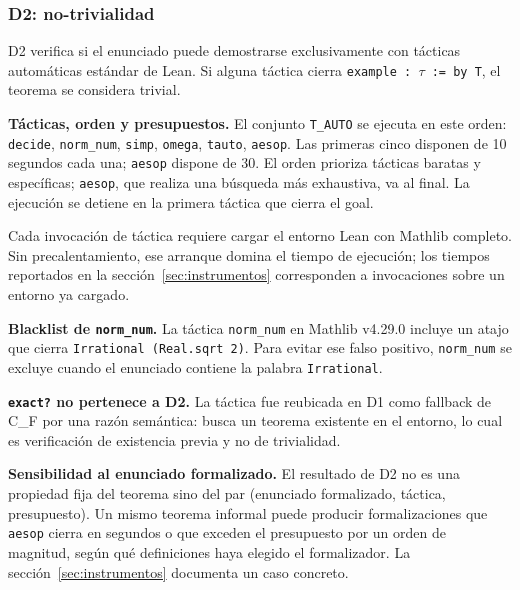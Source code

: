 \documentclass[12pt,a4paper]{article}
\theoremstyle{remark}
\begin{document}
\subsubsection{D2: no-trivialidad}

D2 verifica si el enunciado puede demostrarse exclusivamente con tácticas automáticas estándar de Lean. Si alguna táctica cierra \texttt{example : $\tau$ := by T}, el teorema se considera trivial.

\textbf{Tácticas, orden y presupuestos.} El conjunto \texttt{T\_AUTO} se ejecuta en este orden: \texttt{decide}, \texttt{norm\_num}, \texttt{simp}, \texttt{omega}, \texttt{tauto}, \texttt{aesop}. Las primeras cinco disponen de 10 segundos cada una; \texttt{aesop} dispone de 30. El orden prioriza tácticas baratas y específicas; \texttt{aesop}, que realiza una búsqueda más exhaustiva, va al final. La ejecución se detiene en la primera táctica que cierra el goal.

Cada invocación de táctica requiere cargar el entorno Lean con Mathlib completo. Sin precalentamiento, ese arranque domina el tiempo de ejecución; los tiempos reportados en la sección~\ref{sec:instrumentos} corresponden a invocaciones sobre un entorno ya cargado.

\textbf{Blacklist de \texttt{norm\_num}.} La táctica \texttt{norm\_num} en Mathlib v4.29.0 incluye un atajo que cierra \texttt{Irrational (Real.sqrt 2)}. Para evitar ese falso positivo, \texttt{norm\_num} se excluye cuando el enunciado contiene la palabra \texttt{Irrational}.

\textbf{\texttt{exact?} no pertenece a D2.} La táctica fue reubicada en D1 como fallback de C\_F por una razón semántica: busca un teorema existente en el entorno, lo cual es verificación de existencia previa y no de trivialidad.

\textbf{Sensibilidad al enunciado formalizado.} El resultado de D2 no es una propiedad fija del teorema sino del par (enunciado formalizado, táctica, presupuesto). Un mismo teorema informal puede producir formalizaciones que \texttt{aesop} cierra en segundos o que exceden el presupuesto por un orden de magnitud, según qué definiciones haya elegido el formalizador. La sección~\ref{sec:instrumentos} documenta un caso concreto.
\end{document}
